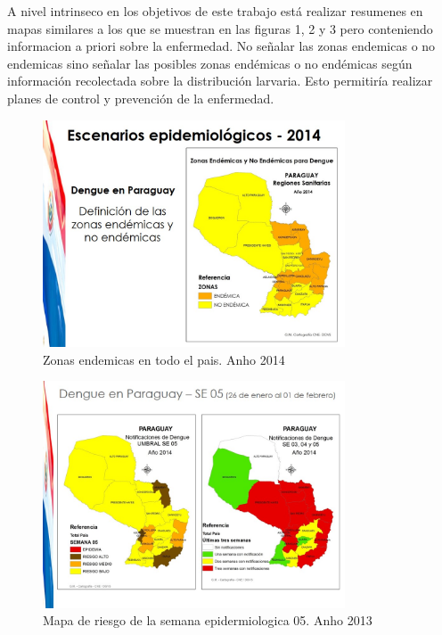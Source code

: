 A nivel intrinseco en los objetivos de este trabajo está realizar resumenes en mapas similares a los que se muestran en las figuras 1, 2 y 3 pero conteniendo informacion a priori sobre la enfermedad. No señalar las zonas endemicas o no endemicas sino señalar las posibles zonas endémicas o no endémicas según información recolectada sobre la distribución larvaria. Esto permitiría realizar planes de control y prevención de la enfermedad.\\

\begin{figure}
\centering
\includegraphics[width=0.8\textwidth]{./graphics/Diapositiva03.JPG}
\caption{\label{fig:mapa1}Zonas endemicas en todo el pais. Anho 2014}
\end{figure}

\begin{figure}
\centering
\includegraphics[width=0.8\textwidth]{./graphics/Diapositiva04.JPG}
\caption{\label{fig:mapa2}Mapa de riesgo de la semana epidermiologica 05. Anho 2013 }
\end{figure}

